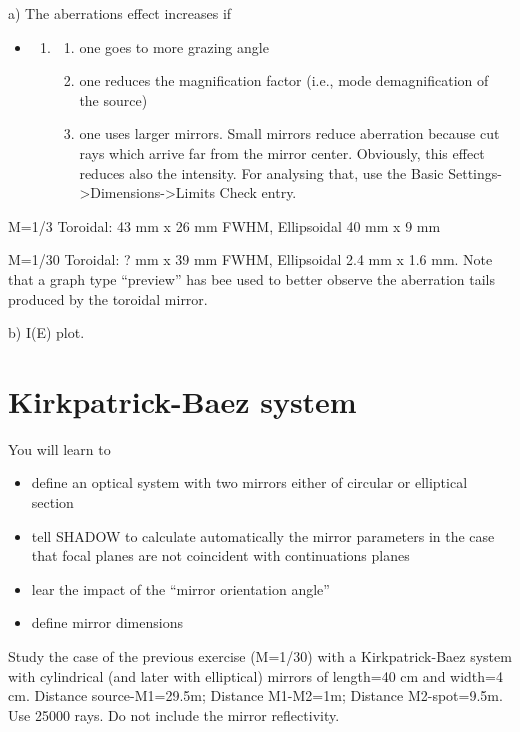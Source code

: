 \documentclass[]{article}
\providecommand{\tightlist}{%
  \setlength{\itemsep}{0pt}\setlength{\parskip}{0pt}}
\begin{document}
a) The aberrations effect increases if

\begin{itemize}
\item
  \begin{enumerate}
  \def\labelenumi{\arabic{enumi}.}
  \item
    \begin{enumerate}
    \def\labelenumii{\roman{enumii})}
    \tightlist
    \item
      one goes to more grazing angle
    \item
      one reduces the magnification factor (i.e., mode demagnification
      of the source)
    \item
      one uses larger mirrors. Small mirrors reduce aberration because
      cut rays which arrive far from the mirror center. Obviously, this
      effect reduces also the intensity. For analysing that, use the
      Basic Settings-\textgreater{}Dimensions-\textgreater{}Limits Check
      entry.
    \end{enumerate}
  \end{enumerate}
\end{itemize}

M=1/3 Toroidal: 43 mm x 26 mm FWHM, Ellipsoidal 40 mm x 9 mm

M=1/30 Toroidal: ? mm x 39 mm FWHM, Ellipsoidal 2.4 mm x 1.6 mm. Note
that a graph type ``preview'' has bee used to better observe the
aberration tails produced by the toroidal mirror.

b) I(E) plot.

\section{Kirkpatrick-Baez system}\label{kirkpatrick-baez-system}

You will learn to

\begin{itemize}
\tightlist
\item
  define an optical system with two mirrors either of circular or
  elliptical section
\item
  tell SHADOW to calculate automatically the mirror parameters in the
  case that focal planes are not coincident with continuations planes
\item
  lear the impact of the ``mirror orientation angle''
\item
  define mirror dimensions
\end{itemize}

Study the case of the previous exercise (M=1/30) with a Kirkpatrick-Baez
system with cylindrical (and later with elliptical) mirrors of length=40
cm and width=4 cm. Distance source-M1=29.5m; Distance M1-M2=1m; Distance
M2-spot=9.5m. Use 25000 rays. Do not include the mirror reflectivity.
\end{document}

